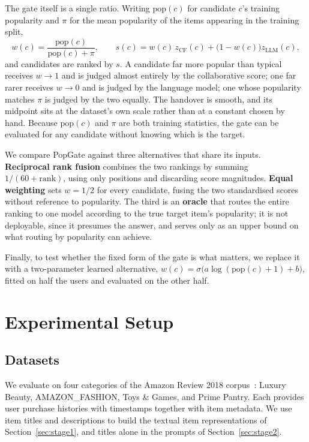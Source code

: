 \documentclass[runningheads]{llncs}
\begin{document}
The gate itself is a single ratio. Writing $\mathrm{pop}(c)$ for candidate $c$'s
training popularity and $\pi$ for the mean popularity of the items appearing in the
training split,
\begin{equation}
w(c) = \frac{\mathrm{pop}(c)}{\mathrm{pop}(c) + \pi}, \qquad
s(c) = w(c)\, z_{\mathrm{CF}}(c) + \bigl(1 - w(c)\bigr) z_{\mathrm{LLM}}(c),
\label{eq:popgate}
\end{equation}
and candidates are ranked by $s$. A candidate far more popular than typical receives
$w \to 1$ and is judged almost entirely by the collaborative score; one far rarer
receives $w \to 0$ and is judged by the language model; one whose popularity matches
$\pi$ is judged by the two equally. The handover is smooth, and its midpoint sits
at the dataset's own scale rather than at a constant chosen by hand. Because
$\mathrm{pop}(c)$ and $\pi$ are both training statistics, the gate can be evaluated
for any candidate without knowing which is the target.

We compare PopGate against three alternatives that share its inputs.
\textbf{Reciprocal rank fusion} combines the two rankings by summing
$1/(60 + \text{rank})$, using only positions and discarding score magnitudes.
\textbf{Equal weighting} sets $w = 1/2$ for every candidate, fusing the two
standardised scores without reference to popularity. The third is an \textbf{oracle}
that routes the entire ranking to one model according to the true target item's
popularity; it is not deployable, since it presumes the answer, and serves only as an
upper bound on what routing by popularity can achieve.

Finally, to test whether the fixed form of the gate is what matters, we replace it
with a two-parameter learned alternative,
$w(c) = \sigma\bigl(a \log(\mathrm{pop}(c) + 1) + b\bigr)$, fitted on half the users
and evaluated on the other half.


\section{Experimental Setup}
\label{sec:setup}

\subsection{Datasets}
\label{sec:datasets}

We evaluate on four categories of the Amazon Review 2018 corpus~\cite{amazonreviews}:
Luxury Beauty, AMAZON\_FASHION, Toys \& Games, and Prime Pantry. Each provides user
purchase histories with timestamps together with item metadata. We use item titles and
descriptions to build the textual item representations of Section~\ref{sec:stage1},
and titles alone in the prompts of Section~\ref{sec:stage2}.
\end{document}
